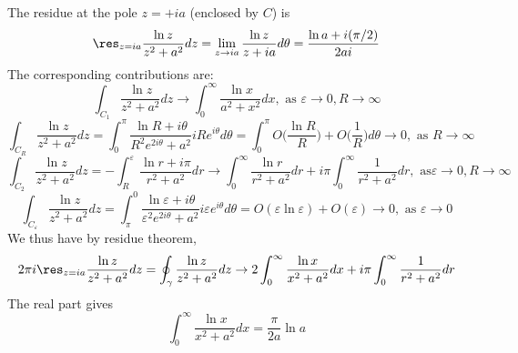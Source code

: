 \documentclass[a4paper]{article}
\begin{document}
\begin{ans}
\begin{enumerate}[label=(\alph*)]
\begin{center}
  \end{center}
\end{enumerate}
The residue at the pole $z=+ia$ (enclosed by $C$) is
$$\res_{z=ia}\frac{\ln z}{z^2+a^2}dz=\lim_{z\rightarrow ia}\frac{\ln z}{z+ia}d\theta =\frac{\ln a+i(\pi/2)}{2ai}$$
The corresponding contributions are:
$$\int_{C_1}\frac{\ln z}{z^2+a^2}dz\rightarrow\int_0^\infty\frac{\ln x}{a^2+x^2}dx,\text{ as }\varepsilon\rightarrow 0,R\rightarrow\infty$$
$$\int_{C_R}\frac{\ln z}{z^2+a^2}dz=\int_0^\pi\frac{\ln R+i\theta}{R^2e^{2i\theta}+a^2}iRe^{i\theta}d\theta=\int_0^\pi O\bigg(\frac{\ln R}{R}\bigg)+O\bigg(\frac{1}{R}\bigg)d\theta\rightarrow 0,\text{ as }R\rightarrow\infty$$
$$\int_{C_2}\frac{\ln z}{z^2+a^2}dz=-\int_R^{\varepsilon}\frac{\ln r+i\pi}{r^2+a^2}dr\rightarrow\int_0^\infty\frac{\ln r}{r^2+a^2}dr+i\pi\int_0^\infty\frac{1}{r^2+a^2}dr,\text{ as} \varepsilon\rightarrow 0,R\rightarrow\infty$$
$$\int_{C_\varepsilon}\frac{\ln z}{z^2+a^2}dz=\int_\pi^0\frac{\ln\varepsilon+i\theta}{\varepsilon^2e^{2i\theta}+a^2}i\varepsilon e^{i\theta}d\theta=O(\varepsilon\ln\varepsilon)+O(\varepsilon)\rightarrow 0,\text{ as }\varepsilon\rightarrow 0$$
We thus have by residue theorem,
$$2\pi i\res_{z=ia}\frac{\ln z}{z^2+a^2}dz=\oint_\gamma\frac{\ln z}{z^2+a^2}dz\rightarrow 2\int_0^\infty\frac{\ln x}{x^2+a^2}dx+i\pi\int_0^\infty\frac{1}{r^2+a^2}dr$$
The real part gives
$$\int_0^\infty\frac{\ln x}{x^2+a^2}dx=\frac{\pi}{2a}\ln a$$
\end{ans}
\newpage
\end{document}
